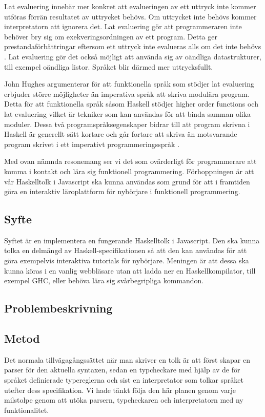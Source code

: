 Lat evaluering innebär mer konkret att evalueringen av ett uttryck inte kommer utföras förrän resultatet av uttrycket behövs. Om uttrycket inte behövs  kommer interpretatorn att ignorera det. 
Lat evaluering gör att programmeraren inte behöver bry sig om exekveringsordningen av ett program. Detta ger prestandaförbättringar eftersom ett uttryck inte evalueras alls om det inte behövs \citep{hudak89}.
Lat evaluering gör det också möjligt att använda sig av oändliga datastrukturer, till exempel oändliga listor. Språket blir därmed mer uttrycksfullt. 

John Hughes argumenterar för att  funktionella språk som stödjer lat evaluering erbjuder större möjligheter än imperativa språk att skriva modulära program. Detta för att funktionella språk såsom Haskell stödjer higher order functions och lat evaluering vilket är tekniker som kan användas för att binda samman olika moduler.
Dessa två programspråksegenskaper bidrar till att program skrivna i Haskell är generellt sätt kortare och går fortare att skriva än motsvarande program skrivet i ett imperativt programmeringsspråk  \citep{why}.

Med ovan nämnda resonemang ser vi det som ovärderligt för programmerare att komma i kontakt och lära sig funktionell programmering. 
Förhoppningen är att vår Haskelltolk i Javascript ska kunna användas som grund för att i framtiden göra en interaktiv läroplattform för nybörjare i funktionell programmering. 


\subsection{Syfte}
Syftet är en implementera en fungerande Haskelltolk i Javascript. Den ska kunna tolka en delmängd av Haskell-specifikationen så att den kan användas för att göra exempelvis interaktiva tutorials för nybörjare.
Meningen är att dessa ska kunna köras i en vanlig webbläsare utan att ladda ner en Haskellkompilator, till exempel GHC, eller behöva lära sig svårbegripliga kommandon.

\subsection{Problembeskrivning} 

\subsection{Metod}
Det normala tillvägagångssättet när man skriver en tolk är att först
skapar en parser för den aktuella syntaxen, sedan en typcheckare med 
hjälp av de för språket definierade typereglerna och sist en interpretator
som tolkar språket utefter dess specifikation. Vi hade tänkt följa den här planen genom varje milstolpe genom att utöka parsern, typcheckaren och interpretatorn med ny funktionalitet.

